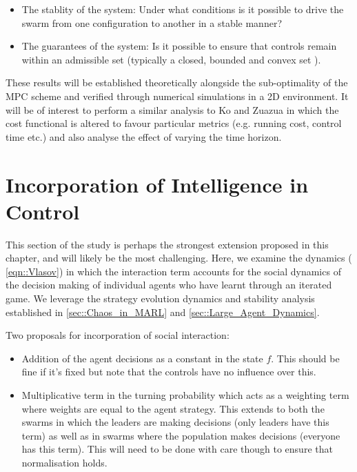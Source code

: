 \documentclass[.../main.tex]{subfiles}
\begin{document}
	\begin{itemize}
		\item The stablity of the system: Under what conditions is it possible to drive the
		swarm from one configuration to another in a stable manner?
		\item The guarantees of the system: Is it possible to ensure that controls remain within an
		admissible set (typically a closed, bounded and convex set \cite{PDEControl}).
	\end{itemize}

	These results will be established theoretically alongside the sub-optimality of the MPC scheme
	and verified through numerical simulations in a 2D environment. It
    will be of interest to perform a similar analysis to Ko and Zuazua \cite{Ko2019} in which the
    cost functional is altered to favour particular metrics  (e.g. running cost, control time etc.)
    and also analyse the effect of varying the time horizon.

    \section{Incorporation of Intelligence in Control} \label{sec::Intelligence_in_control}

    This section of the study is perhaps the strongest extension proposed in this
	chapter, and will likely be the most challenging. Here, we examine the dynamics (
	\ref{eqn::Vlasov}) in which the interaction term accounts for the social dynamics of the
	decision making of individual agents who have learnt through an iterated game. We leverage the
	strategy evolution dynamics and stability analysis established in 
	\ref{sec::Chaos_in_MARL} and \ref{sec::Large_Agent_Dynamics}. 

	Two proposals for incorporation of social interaction:
	\begin{itemize}
		\item Addition of the agent decisions as a constant in the state $f$. This should be fine if
		it's fixed but note that the controls have no influence over this.
		\item Multiplicative term in the turning probability which acts as a weighting term where
		weights are equal to the agent strategy. This extends to both the swarms in
		which the leaders are making decisions (only leaders have this term) as well as in
		swarms where the population makes decisions (everyone has this term). This will need to be
		done with care though to ensure that normalisation holds.
	\end{itemize}
\end{document}
